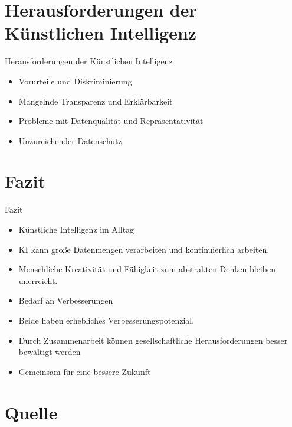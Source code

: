 \documentclass[169,9pt]{beamer}
\begin{document}
\section{Herausforderungen der Künstlichen Intelligenz}\sectionFrame

\begin{frame}{Herausforderungen der Künstlichen Intelligenz}
\begin{itemize}
    \item Vorurteile und Diskriminierung
    \item Mangelnde Transparenz und Erklärbarkeit
    \item Probleme mit Datenqualität und Repräsentativität
    \item Unzureichender Datenschutz
\end{itemize}
\end{frame}

\section{Fazit}\sectionFrame

\begin{frame}{Fazit}
\begin{itemize}
    \item Künstliche Intelligenz im Alltag
    \item KI kann große Datenmengen verarbeiten und kontinuierlich arbeiten.
    \item Menschliche Kreativität und Fähigkeit zum abstrakten Denken bleiben unerreicht.
    \item Bedarf an Verbesserungen
    \item Beide haben erhebliches Verbesserungspotenzial.
    \item Durch Zusammenarbeit können gesellschaftliche Herausforderungen besser bewältigt werden
    \item Gemeinsam für eine bessere Zukunft
\end{itemize}
\end{frame}

\section{Quelle}\sectionFrame
\end{document}
